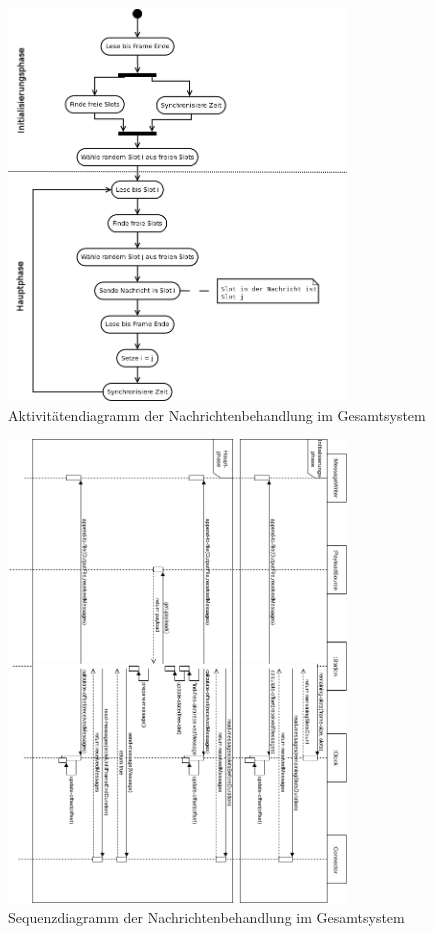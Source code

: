 \documentclass[draft=false
              ,paper=a4
              ,twoside=false
              ,fontsize=11pt
              ,headsepline
              ,BCOR10mm
              ,DIV11
              ]{scrbook}
\begin{document}
\begin{figure}[h]
\centering
\includegraphics[width=0.8\textwidth]{activity-diagram.png}
\caption[activity-diagram]{Aktivitätendiagramm der Nachrichtenbehandlung im Gesamtsystem}
\label{fig:component-diagram}
\end{figure}

\begin{figure}[h]
\centering
\includegraphics[width=0.8\textwidth]{sequence-diagram.png}
\caption[sequence-diagram]{Sequenzdiagramm der Nachrichtenbehandlung im Gesamtsystem}
\label{fig:sequence-diagram}
\end{figure}
\end{document}
